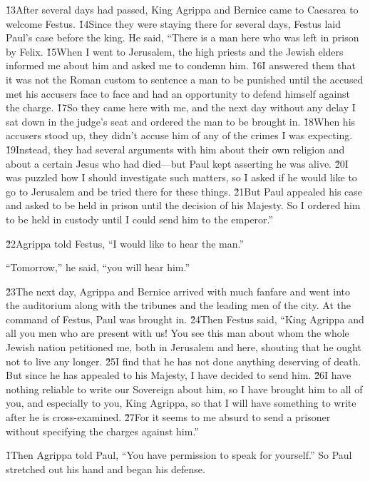 \v{13}After several days had passed, King Agrippa and Bernice came to Caesarea to welcome Festus. \v{14}Since they were staying there for several days, Festus laid Paul's case before the king. He said, ``There is a man here who was left in prison by Felix. \v{15}When I went to Jerusalem, the high priests and the Jewish elders informed me about him and asked me to condemn him. \v{16}I answered them that it was not the Roman custom to sentence a man to be punished until the accused met his accusers face to face and had an opportunity to defend himself against the charge. \v{17}So they came here with me, and the next day without any delay I sat down in the judge's seat and ordered the man to be brought in. \v{18}When his accusers stood up, they didn't accuse him of any of the crimes I was expecting. \v{19}Instead, they had several arguments with him about their own religion and about a certain Jesus who had died---but Paul kept asserting he was alive. \v{20}I was puzzled how I should investigate such matters, so I asked if he would like to go to Jerusalem and be tried there for these things. \v{21}But Paul appealed his case and asked to be held in prison until the decision of his Majesty. So I ordered him to be held in custody until I could send him to the emperor.''

\v{22}Agrippa told Festus, ``I would like to hear the man.''

``Tomorrow,'' he said, ``you will hear him.''

\v{23}The next day, Agrippa and Bernice arrived with much fanfare and went into the auditorium along with the tribunes and the leading men of the city. At the command of Festus, Paul was brought in. \v{24}Then Festus said, ``King Agrippa and all you men who are present with us! You see this man about whom the whole Jewish nation petitioned me, both in Jerusalem and here, shouting that he ought not to live any longer. \v{25}I find that he has not done anything deserving of death. But since he has appealed to his Majesty, I have decided to send him. \v{26}I have nothing reliable to write our Sovereign about him, so I have brought him to all of you, and especially to you, King Agrippa, so that I will have something to write after he is cross-examined. \v{27}For it seems to me absurd to send a prisoner without specifying the charges against him.''

\v{1}Then Agrippa told Paul, ``You have permission to speak for yourself.'' So Paul stretched out his hand and began his defense.

